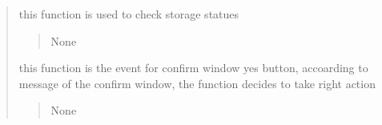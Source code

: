\documentclass[letterpaper,10pt,english]{sphinxmanual}
\begin{document}
\begin{quote}
\begin{savenotes}
\begin{fulllineitems}

\begin{savenotes}\begin{fulllineitems}
\label{\detokenize{setting/setting_api:oxin.setting_api.API.check_storage_status}}
\pysigstartsignatures
{}
\pysigstopsignatures
\sphinxAtStartPar
this function is used to check storage statues
\begin{quote}\begin{description}
\sphinxAtStartPar
None

\end{description}\end{quote}

\end{fulllineitems}\end{savenotes}


\begin{savenotes}\begin{fulllineitems}
\label{\detokenize{setting/setting_api:oxin.setting_api.API.confirm_yes}}
\pysigstartsignatures
{}
\pysigstopsignatures
\sphinxAtStartPar
this function is the event for confirm window yes button,
accoarding to message of the confirm window, the function decides to take right action
\begin{quote}\begin{description}
\sphinxAtStartPar
None

\end{description}\end{quote}

\end{fulllineitems}\end{savenotes}



\end{fulllineitems}
\end{savenotes}
\end{quote}
\end{document}
